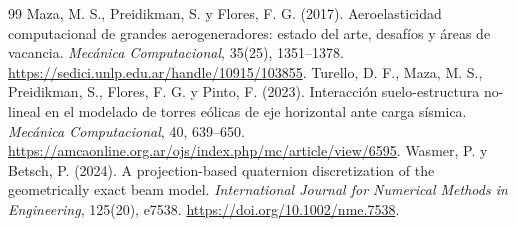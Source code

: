 \documentclass[11pt,a4paper,oneside]{report}
\begin{document}
\begin{thebibliography}{99}
 Maza, M. S., Preidikman, S. y Flores, F. G. (2017). Aeroelasticidad computacional de grandes aerogeneradores: estado del arte, desafíos y áreas de vacancia. \emph{Mecánica Computacional}, 35(25), 1351--1378. \url{https://sedici.unlp.edu.ar/handle/10915/103855}.
 Turello, D. F., Maza, M. S., Preidikman, S., Flores, F. G. y Pinto, F. (2023). Interacción suelo-estructura no-lineal en el modelado de torres eólicas de eje horizontal ante carga sísmica. \emph{Mecánica Computacional}, 40, 639--650. \url{https://amcaonline.org.ar/ojs/index.php/mc/article/view/6595}.
 Wasmer, P. y Betsch, P. (2024). A projection-based quaternion discretization of the geometrically exact beam model. \emph{International Journal for Numerical Methods in Engineering}, 125(20), e7538. \url{https://doi.org/10.1002/nme.7538}.
\end{thebibliography}
\end{document}
